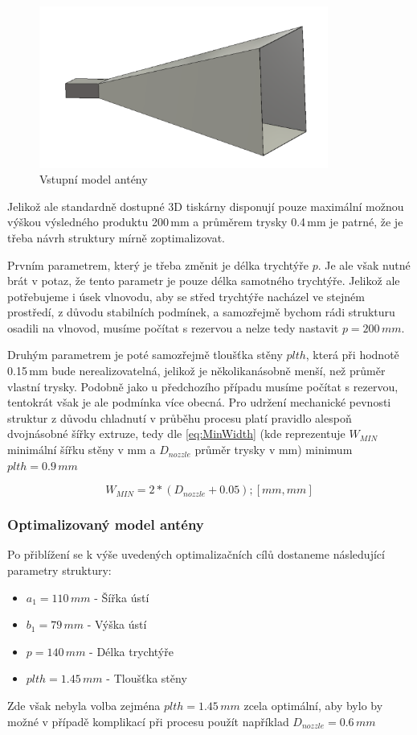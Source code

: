 \begin{figure}[!htbp]
\begin{center}
\includegraphics[width=9.5cm]{pics/HornOptimal}
\caption{Vstupní model antény}
\label{fig:hornOptimal}
\end{center}
\end{figure}

Jelikož ale standardně dostupné 3D tiskárny disponují pouze maximální možnou výškou výsledného produktu 200\,mm a průměrem trysky 0.4\,mm je patrné, že je třeba návrh struktury mírně zoptimalizovat.

Prvním parametrem, který je třeba změnit je délka trychtýře $p$. Je ale však nutné brát v potaz, že tento parametr je pouze délka samotného trychtýře. Jelikož ale potřebujeme i úsek vlnovodu, aby se střed trychtýře nacházel ve stejném prostředí, z důvodu stabilních podmínek, a samozřejmě bychom rádi strukturu osadili na vlnovod, musíme počítat s rezervou a nelze tedy nastavit  $p=200\,mm$.

Druhým parametrem je poté samozřejmě tloušťka stěny $plth$, která při hodnotě 0.15\,mm bude nerealizovatelná, jelikož je několikanásobně menší, než průměr vlastní trysky. Podobně jako u předchozího případu musíme počítat s rezervou, tentokrát však je ale podmínka více obecná. Pro udržení mechanické pevnosti struktur z důvodu chladnutí v průběhu procesu platí pravidlo alespoň dvojnásobné šířky extruze, tedy dle \ref{eq:MinWidth} (kde reprezentuje $W_{MIN}$ minimální šířku stěny v mm a $D_{nozzle}$ průměr trysky v mm) minimum $plth = 0.9\,mm$

\begin{equation}
W_{MIN} = 2*(D_{nozzle}+0.05) ; [mm, mm]
\label{eq:MinWidth}
\end{equation}

\subsubsection{Optimalizovaný model antény}
Po přiblížení se k výše uvedených optimalizačních cílů dostaneme následující parametry struktury:
\begin{itemize}
\item $a_1 = 110\,mm$ - Šířka ústí
\item $b_1 = 79\,mm$ - Výška ústí
\item $p = 140\,mm$ - Délka trychtýře
\item $plth = 1.45\,mm$ - Tloušťka stěny
\end{itemize}
Zde však nebyla volba zejména $plth = 1.45\,mm$ zcela optimální, aby bylo by možné v případě komplikací při procesu použít například $D_{nozzle} = 0.6\,mm$ 

